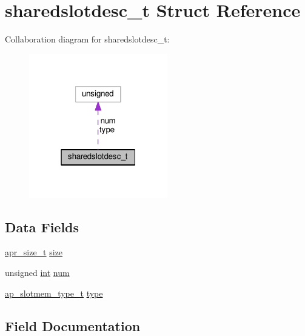 \hypertarget{structsharedslotdesc__t}{}\section{sharedslotdesc\+\_\+t Struct Reference}
\label{structsharedslotdesc__t}


Collaboration diagram for sharedslotdesc\+\_\+t\+:
\nopagebreak
\begin{figure}[H]
\begin{center}
\leavevmode
\includegraphics[width=171pt]{structsharedslotdesc__t__coll__graph}
\end{center}
\end{figure}
\subsection*{Data Fields}
\begin{DoxyCompactItemize}
\item 
\hyperlink{group__apr__platform_gaaa72b2253f6f3032cefea5712a27540e}{apr\+\_\+size\+\_\+t} \hyperlink{structsharedslotdesc__t_a9d3fe8b72c399a5fe6936ce58b222e49}{size}
\item 
unsigned \hyperlink{pcre_8txt_a42dfa4ff673c82d8efe7144098fbc198}{int} \hyperlink{structsharedslotdesc__t_a640a5fdeca4c3c9a3f19364924bd6447}{num}
\item 
\hyperlink{group__MEM_ga2e647f79e68a1f0e6e733ec197c03bcc}{ap\+\_\+slotmem\+\_\+type\+\_\+t} \hyperlink{structsharedslotdesc__t_a4b50c23b68824dd3aefe38db409a4555}{type}
\end{DoxyCompactItemize}


\subsection{Field Documentation}
